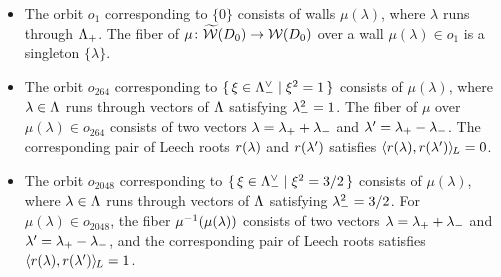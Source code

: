 \documentclass{amsart} %
\begin{document}
\begin{itemize}
\item[($1$)]
The orbit $o_1$ corresponding to $\{0\}$
consists of walls $\mu(\lambda)$,
where $\lambda$ runs through $\Lambda_{+}$.
The fiber of $\mu\colon \widetilde{\mathord{\mathcal{W}}}(D_0)\to\mathord{\mathcal{W}}(D_0)$ 
over a wall $\mu(\lambda)\in o_1$ is a singleton $\{\lambda\}$.
%
\item[($264$)]
The orbit $o_{264}$ corresponding to $\{\,{\xi\in \Lambda_{-}^{\vee}}\mid {\xi^2=1} \,\}$
consists of $\mu(\lambda)$,
where $\lambda\in \Lambda$ runs through
vectors of $\Lambda$ satisfying ${\lambda}_{-}^2=1$.
The fiber of $\mu$ 
over $\mu(\lambda)\in o_{264}$ consists 
of two vectors
$\lambda={\lambda}_{+}+{\lambda}_{-}$ and $\lambda^{\prime}={\lambda}_{+}-{\lambda}_{-}$.
The corresponding pair of Leech roots 
$r(\lambda)$ and $r(\lambda^{\prime})$ satisfies
$\langle r(\lambda), r(\lambda^{\prime}) \rangle_{\hskip -1pt L}=0$.
%
\item[($2048$)]
The orbit $o_{2048}$ corresponding to $\{\,{\xi\in \Lambda_{-}^{\vee}}\mid {\xi^2=3/2} \,\}$
consists of $\mu(\lambda)$,
where $\lambda\in \Lambda$ runs through
vectors of $\Lambda$ satisfying ${\lambda}_{-}^2=3/2$.
For $\mu(\lambda)\in o_{2048}$, the fiber
 $\mu^{-1}(\mu(\lambda))$ consists 
of two vectors
$\lambda={\lambda}_{+}+{\lambda}_{-}$ and $\lambda^{\prime}={\lambda}_{+}-{\lambda}_{-}$, and 
the corresponding pair of Leech roots 
 satisfies
$\langle r(\lambda), r(\lambda^{\prime}) \rangle_{\hskip -1pt L}=1$.

\end{itemize}
%
\end{document}

